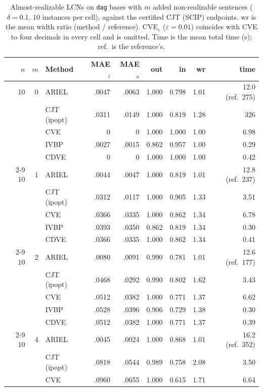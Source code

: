 \begin{table}[htbp]
\centering
\scriptsize
\caption{Almost-realizable LCNs on \texttt{dag} bases with $m$ added non-realizable sentences ($\delta=0.1$, $10$ instances per cell), against the certified CJT (SCIP) endpoints. wr is the mean width ratio (method / reference). CVE$_\varepsilon$ ($\varepsilon{=}0.01$) coincides with CVE to four decimals in every cell and is omitted. Time is the mean total time (s); ref.\ is the reference's.}
\label{tab:nr-dag}
\begin{tabular}{rrlrrrrrr}
\toprule
$n$ & $m$ & Method & MAE$_l$ & MAE$_u$ & out & in & wr & time \\
\midrule
10 & 0 & ARIEL & .0047 & .0063 & 1.000 & 0.798 & 1.01 & 12.0 (ref.\ 275) \\
 &  & CJT (ipopt) & .0311 & .0149 & 1.000 & 0.819 & 1.28 & 326 \\
 &  & CVE & 0 & 0 & 1.000 & 1.000 & 1.00 & 6.98 \\
 &  & IVBP & .0027 & .0015 & 0.862 & 0.957 & 1.00 & 0.29 \\
 &  & CDVE & 0 & 0 & 1.000 & 1.000 & 1.00 & 0.42 \\
\cmidrule(l){2-9}
10 & 1 & ARIEL & .0044 & .0047 & 1.000 & 0.819 & 1.01 & 12.8 (ref.\ 237) \\
 &  & CJT (ipopt) & .0312 & .0117 & 1.000 & 0.905 & 1.33 & 3.51 \\
 &  & CVE & .0366 & .0335 & 1.000 & 0.862 & 1.34 & 6.78 \\
 &  & IVBP & .0393 & .0350 & 0.862 & 0.819 & 1.34 & 0.30 \\
 &  & CDVE & .0366 & .0335 & 1.000 & 0.862 & 1.34 & 0.41 \\
\cmidrule(l){2-9}
10 & 2 & ARIEL & .0080 & .0091 & 0.990 & 0.781 & 1.01 & 12.6 (ref.\ 177) \\
 &  & CJT (ipopt) & .0468 & .0292 & 0.990 & 0.802 & 1.62 & 3.43 \\
 &  & CVE & .0512 & .0382 & 1.000 & 0.771 & 1.37 & 6.62 \\
 &  & IVBP & .0528 & .0396 & 0.906 & 0.729 & 1.38 & 0.30 \\
 &  & CDVE & .0512 & .0382 & 1.000 & 0.771 & 1.37 & 0.39 \\
\cmidrule(l){2-9}
10 & 4 & ARIEL & .0045 & .0024 & 1.000 & 0.868 & 1.01 & 16.2 (ref.\ 352) \\
 &  & CJT (ipopt) & .0818 & .0544 & 0.989 & 0.758 & 2.08 & 3.50 \\
 &  & CVE & .0960 & .0655 & 1.000 & 0.615 & 1.71 & 6.64 \\

\end{tabular}
\end{table}
